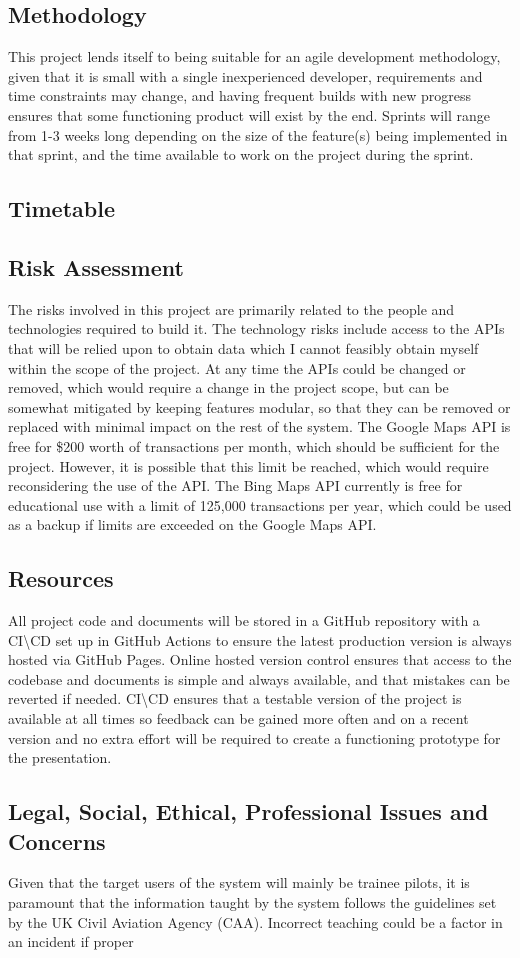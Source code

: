 \subsection{Methodology}
This project lends itself to being suitable for an agile development methodology, given that it is small with a single inexperienced developer, requirements and time constraints may change, and having frequent builds with new progress ensures that some functioning product will exist by the end. Sprints will range from 1-3 weeks long depending on the size of the feature(s) being implemented in that sprint, and the time available to work on the project during the sprint.

\subsection{Timetable}
\subsection{Risk Assessment}
The risks involved in this project are primarily related to the people and technologies required to build it.
The technology risks include access to the APIs that will be relied upon to obtain data which I cannot feasibly obtain myself within the scope of the project.
At any time the APIs could be changed or removed, which would require a change in the project scope, but can be somewhat mitigated by keeping features modular, so that they can be removed or replaced with minimal impact on the rest of the system.
The Google Maps API is free for \$200 worth of transactions per month, which should be sufficient for the project. However, it is possible that this limit be reached, which would require reconsidering the use of the API.
The Bing Maps API currently is free for educational use with a limit of 125,000 transactions per year, which could be used as a backup if limits are exceeded on the Google Maps API.
\subsection{Resources}
All project code and documents will be stored in a GitHub repository with a CI\textbackslash CD set up in GitHub Actions to ensure the latest production version is always hosted via GitHub Pages. Online hosted version control ensures that access to the codebase and documents is simple and always available, and that mistakes can be reverted if needed. CI\textbackslash CD ensures that a testable version of the project is available at all times so feedback can be gained more often and on a recent version and no extra effort will be required to create a functioning prototype for the presentation.
\subsection{Legal, Social, Ethical, Professional Issues and Concerns}
Given that the target users of the system will mainly be trainee pilots, it is paramount that the information taught by the system follows the guidelines set by the UK Civil Aviation Agency (CAA). Incorrect teaching could be a factor in an incident if proper 